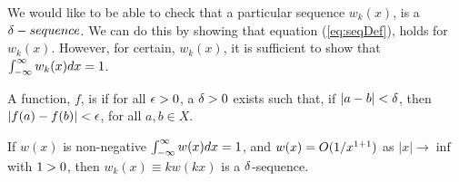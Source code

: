 We would like to be able to check that a particular sequence \(w_k(x)\), is a \(\delta-sequence\). We can do this by showing that equation (\ref{eq:seqDef}), holds for \(w_k(x)\). However, for certain, \(w_k(x)\), it is sufficient to show that \(\int_{-\infty}^{\infty} w_k(x)dx=1\).

\begin{definition}
    A function, \(f\), is  if for all \(\epsilon>0\), a \(\delta >0\) exists such that, if \(|a-b|<\delta\), then \(|f(a)-f(b)|<\epsilon\), for all \(a,b\in X\).
\end{definition}

\begin{theorem}\label{th:assertion}
    If \(w(x)\) is non-negative \(\int_{-\infty}^{\infty} w(x) dx = 1\), and \(w(x)=O(1/x^{1+1})\) as \(|x| \rightarrow \inf\) with \(1>0\), then \( w_k(x) \equiv kw(kx)\) is a \(\delta\)-sequence.
\end{theorem}
